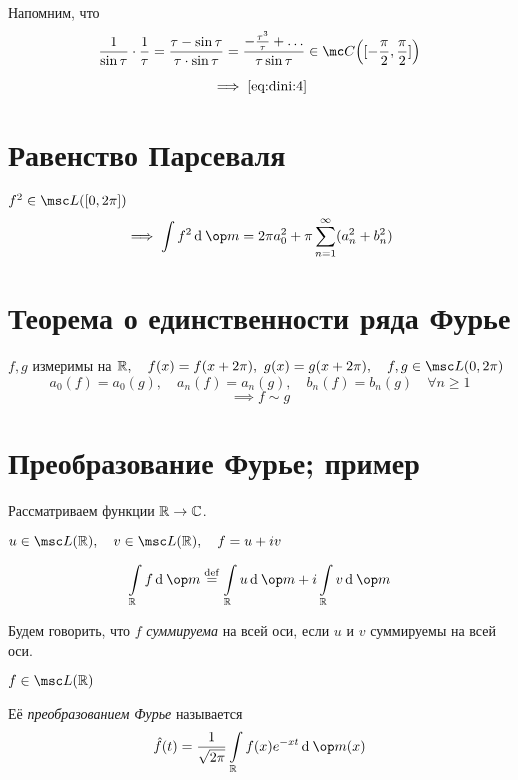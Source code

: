 Напомним, что
$$ \frac1{\sin \tau} \cdot \frac1\tau = \frac{\tau - \sin \tau}{\tau \cdot \sin \tau} = \frac{-\frac{\tau^3}\tau + \dots}{\tau \sin \tau} \in \mc C \Bigl( [-\frac\pi 2, \frac\pi2] \Bigr) $$

$$ \implies \eref{dini:4} $$


\section{Равенство Парсеваля}

\begin{theorem}
	$ f^2 \in \msc L([0, 2\pi]) $
	$$ \implies \int f^2 \di \op m = 2 \pi a_0^2 + \pi \sum_{n = 1}^\infty (a_n^2 + b_n^2) $$
\end{theorem}

\section{Теорема о единственности ряда Фурье}

\begin{theorem}
	$ f, g $ измеримы на $ \R, \quad f(x) = f(x + 2\pi), ~ g(x) = g(x + 2\pi), \quad f, g \in \msc L(0, 2\pi) $
	$$ a_0(f) = a_0(g), \quad a_n(f) = a_n(g), \quad b_n(f) = b_n(g) \quad \forall n \ge 1 $$
	$$ \implies f \sim g $$
\end{theorem}

\section{Преобразование Фурье; пример}

Рассматриваем функции $ \mathbb{R} \to \mathbb{C} $.

\begin{definition}
	$ u \in \msc L(\R), \quad v \in \msc L(\R), \quad f = u + iv $
	\begin{remind}
		$$ \int\limits_\R f \di \op m \bydef \int\limits_\R u \di \op m + i \int\limits_\R v \di \op m $$
	\end{remind}

	Будем говорить, что $ f $ \emph{суммируема} на всей оси, если $ u $ и $ v $ суммируемы на всей оси.
\end{definition}

\begin{definition}
	$ f \in \msc L(\R) $

	Её \emph{преобразованием Фурье} называется
	$$ \hat f(t) = \frac1{\sqrt{2\pi}} \int\limits_\R f(x) e^{-xt} \di \op m (x) $$
\end{definition}

